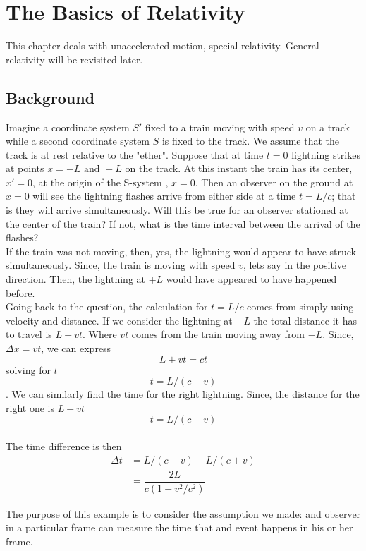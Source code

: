 \chapter{The Basics of Relativity}
This chapter deals with unaccelerated motion, special relativity. General relativity will be revisited later.
\section{Background}
\begin{example}
	Imagine a coordinate system $ S' $ fixed to a train moving with speed $ v $ on a track while a second coordinate system $ S $ is fixed to the track. We assume that the track is at rest relative to the "ether". Suppose that at time $ t = 0 $ lightning strikes at points $ x = -L  \mbox{ and } +L$ on the track. At this instant the train has its center, $ x' = 0$, at the origin of the S-system , $ x = 0 $. Then an observer on the ground at $ x = 0 $ will see the lightning flashes arrive from either side at a time $ t = L/c $; that is they will arrive simultaneously. Will this be true for an observer stationed at the center of the train? If not, what is the time interval between the arrival of the flashes? \\
	If the train was not moving, then, yes, the lightning would appear to have struck simultaneously. Since, the train is moving with speed $ v $, lets say in the positive direction. Then, the lightning at $ +L $ would have appeared to have happened before. \\
	Going back to the question, the calculation for $ t = L/c $ comes from simply using velocity and distance. If we consider the lightning at $ -L $ the total distance it has to travel is $ L + vt$. Where $ vt $ comes from the train moving away from $ -L $. Since, $ \Delta x = \bar{v}t $, we can express \[ L +vt = ct \] solving for $ t $ \[ t = L/(c-v) \]. We can similarly find the time for the right lightning. Since, the distance for the right one is $ L - vt $  \[ t = L / (c+v) \] \\ 
	The time difference is then 
		\begin{align*}
			\Delta t &= L/(c-v) - L/(c+v) \\
			&= \dfrac{2L}{c(1-v^2/c^2)}
		\end{align*}
\end{example}
The purpose of this example is to consider the assumption we made: and observer in a particular frame can measure the time that and event happens in his or her frame. \\
